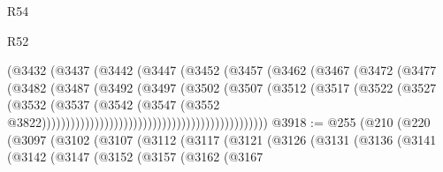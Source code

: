 \begin{lexlean}{R54}
\begin{lexlean}{R52}
\begin{coremodule}
{{{{{{{{{{{{{{{{{{{{{{{{{{{{{{{{{{{{{{{{{{{{{{{{{{{{{{{{{{{{{{{{{{{{{{{{{{{{{{{{{{{{{{{{{{{{{{{{{{{{{{{{{{{{{{{{{{{{{{{{{{{{{{{{{{{{{{{{{{{{{{{{{{{{{{{{{{{{{{{{{{{{{{{{{{{{{{{{{{{{{{{{{{{{{{{{{{{{{{                                                (@3432
                                                  (@3437
                                                    (@3442
                                                      (@3447
                                                        (@3452
                                                          (@3457
                                                            (@3462
                                                              (@3467
                                                                (@3472
                                                                  (@3477
                                                                    (@3482
                                                                      (@3487
                                                                        (@3492
                                                                          (@3497
                                                                            (@3502
                                                                              (@3507
                                                                                (@3512
                                                                                  (@3517
                                                                                    (@3522
                                                                                      (@3527
                                                                                        (@3532
                                                                                          (@3537
                                                                                            (@3542
                                                                                              (@3547
                                                                                                (@3552
                                                                                                  @3822)))))))))))))))))))))))))))))))))))))))))))))))
@3918 := @255
    (@210
      (@220
        (@3097
          (@3102
            (@3107
              (@3112
                (@3117
                  (@3121
                    (@3126
                      (@3131
                        (@3136
                          (@3141
                            (@3142
                              (@3147
                                (@3152
                                  (@3157
                                    (@3162
                                      (@3167
}}}}}}}}}}}}}}}}}}}}}}}}}}}}}}}}}}}}}}}}}}}}}}}}}}}}}}}}}}}}}}}}}}}}}}}}}}}}}}}}}}}}}}}}}}}}}}}}}}}}}}}}}}}}}}}}}}}}}}}}}}}}}}}}}}}}}}}}}}}}}}}}}}}}}}}}}}}}}}}}}}}}}}}}}}}}}}}}}}}}}}}}}}}}}}}}}}}}}}
\end{coremodule}
\end{lexlean}
\end{lexlean}
